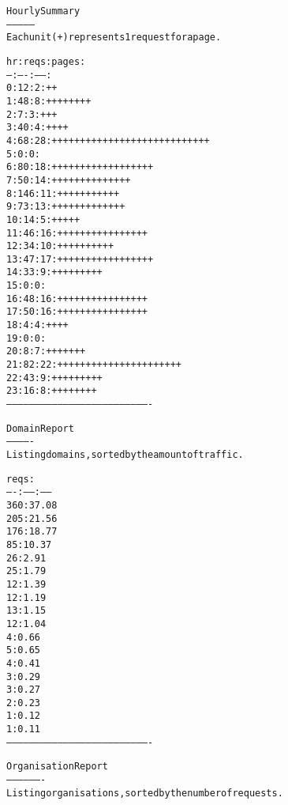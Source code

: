 \begin{alltt}
Hourly Summary
--------------
Each unit (+) represents 1 request for a page.

hr: reqs: pages: 
--: ----: -----: 
 0:   12:     2: ++
 1:   48:     8: ++++++++
 2:    7:     3: +++
 3:   40:     4: ++++
 4:   68:    28: ++++++++++++++++++++++++++++
 5:    0:     0: 
 6:   80:    18: ++++++++++++++++++
 7:   50:    14: ++++++++++++++
 8:  146:    11: +++++++++++
 9:   73:    13: +++++++++++++
10:   14:     5: +++++
11:   46:    16: ++++++++++++++++
12:   34:    10: ++++++++++
13:   47:    17: +++++++++++++++++
14:   33:     9: +++++++++
15:    0:     0: 
16:   48:    16: ++++++++++++++++
17:   50:    16: ++++++++++++++++
18:    4:     4: ++++
19:    0:     0: 
20:    8:     7: +++++++
21:   82:    22: ++++++++++++++++++++++
22:   43:     9: +++++++++
23:   16:     8: ++++++++
----------------------------------------------------------------------------

Domain Report
-------------
Listing domains, sorted by the amount of traffic.

reqs: %bytes: domain
----: ------: ------
 360: 37.08%: .com (Commercial)
 205: 21.56%: .net (Network)
 176: 18.77%: [unresolved numerical addresses]
  85: 10.37%: .de (Germany)
  26:  2.91%: .fr (France)
  25:  1.79%: .gov (USA Government)
  12:  1.39%: .dk (Denmark)
  12:  1.19%: .uk (United Kingdom)
  13:  1.15%: .au (Australia)
  12:  1.04%: .at (Austria)
   4:  0.66%: .edu (USA Educational)
   5:  0.65%: .se (Sweden)
   4:  0.41%: .fi (Finland)
   3:  0.29%: .br (Brazil)
   3:  0.27%: .arpa (Old style Arpanet)
   2:  0.23%: .be (Belgium)
   1:  0.12%: .mil (USA Military)
   1:  0.11%: .za (South Africa)
----------------------------------------------------------------------------

Organisation Report
-------------------
Listing organisations, sorted by the number of requests.


\end{alltt}
